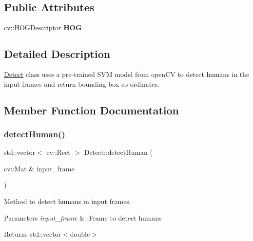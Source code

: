 \subsection*{Public Attributes}
\begin{DoxyCompactItemize}
\item 
\mbox{\label{classDetect_a7b4db15c556678a0f8e7ec1f925bd79d}} 
cv\+::\+H\+O\+G\+Descriptor {\bfseries H\+OG}
\end{DoxyCompactItemize}


\subsection{Detailed Description}
\hyperlink{classDetect}{Detect} class uses a pre-\/trained S\+VM model from open\+CV to detect humans in the input frames and return bounding box co-\/ordinates. 

\subsection{Member Function Documentation}
\mbox{\label{classDetect_a4fc823d563ef5b0ff3045ba0ddf41572}} 
\subsubsection{\texorpdfstring{detect\+Human()}{detectHuman()}}
{\footnotesize\ttfamily std\+::vector$<$ cv\+::\+Rect $>$ Detect\+::detect\+Human (\begin{DoxyParamCaption}\item[{cv\+::\+Mat \&}]{input\+\_\+frame }\end{DoxyParamCaption})}



Method to detect humans in input frames. 


\begin{DoxyParams}{Parameters}
{\em input\+\_\+frame} & \+:Frame to detect humans \\
\hline
\end{DoxyParams}
\begin{DoxyReturn}{Returns}
std\+::vector$<$double$>$ 
\end{DoxyReturn}
\mbox{\label{classDetect_a5460dd416bb18ad8eefb78808ac41295}} 
